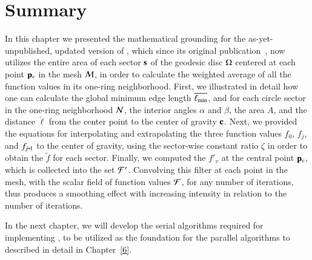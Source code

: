 \section{Summary}
In this chapter we presented the mathematical grounding for the as-yet-unpublished, updated version of , which since its original publication~\cite[s.~3.2]{Mara17}, now utilizes the entire area of each sector $\mathbf{s}$ of the geodesic disc $\Omega$ centered at each point $\mathbf{p}_v$ in the mesh $\mathcal{M}$, in order to calculate the weighted average of all the function values in its one-ring neighborhood. First, we illustrated in detail how one can calculate the global minimum edge length $\overline{\ell_\text{min}}$, and for each circle sector in the one-ring neighborhood $\mathcal{N}$, the interior angles $\alpha$ and $\beta$, the area $A$, and the distance $\check{\ell}$ from the center point to the center of gravity $\mathbf{c}$. Next, we provided the equations for interpolating and extrapolating the three function values $f_0$, $f_j$, and $f_{\sjpo}$ to the center of gravity, using the sector-wise constant ratio $\zeta$ in order to obtain the \wmfv{} $\tilde{f}$ for each sector. Finally, we computed the \wmfv{} $f'_v$ at the central point $\mathbf{p}_v$, which is collected into the set $\mathcal{F}'$. Convolving this filter at each point in the mesh, with the scalar field of function values $\mathcal{F}$, for any number of iterations, thus produces a smoothing effect with increasing intensity in relation to the number of iterations.

In the next chapter, we will develop the serial algorithms required for implementing , to be utilized as the foundation for the parallel algorithms to described in detail in Chapter~\ref{6}.
